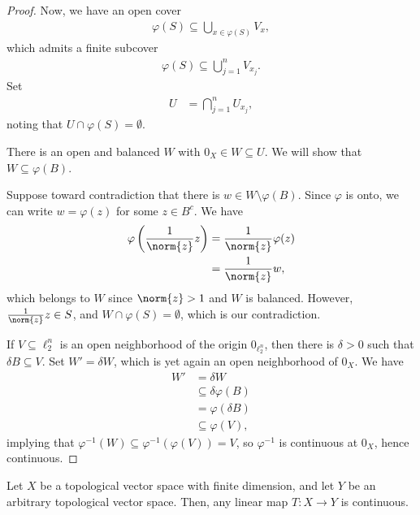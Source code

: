 \documentclass[10pt]{mypackage}
\begin{document}
\begin{proof}
  Now, we have an open cover
  \begin{align*}
    \varphi(S) \subseteq \bigcup_{x\in\varphi(S)}V_{x},
  \end{align*}
  which admits a finite subcover
  \begin{align*}
    \varphi(S) \subseteq \bigcup_{j=1}^{n}V_{x_j}.
  \end{align*}
  Set
  \begin{align*}
    U &= \bigcap_{j=1}^{n}U_{x_j},
  \end{align*}
  noting that $U\cap \varphi(S) = \emptyset$.\newline

  There is an open and balanced $W$ with $0_{X}\in W\subseteq U$. We will show that $W\subseteq \varphi(B)$.\newline

  Suppose toward contradiction that there is $w\in W\setminus \varphi(B)$. Since $\varphi$ is onto, we can write $w = \varphi(z)$ for some $z\in B^{c}$. We have
  \begin{align*}
    \varphi\left(\frac{1}{\norm{z}}z\right) &= \frac{1}{\norm{z}}\varphi(z)\\
                                            &= \frac{1}{\norm{z}} w,
  \end{align*}
  which belongs to $W$ since $\norm{z} > 1$ and $W$ is balanced. However, $\frac{1}{\norm{z}}z\in S$, and $W\cap \varphi(S) = \emptyset$, which is our contradiction.\newline

  If $V\subseteq \ell_{2}^{n}$ is an open neighborhood of the origin $0_{\ell_{2}^{n}}$, then there is $\delta > 0$ such that $\delta B \subseteq V$. Set $W' = \delta W$, which is yet again an open neighborhood of $0_{X}$. We have
  \begin{align*}
    W' &= \delta W\\
       &\subseteq \delta \varphi(B)\\
       &= \varphi\left(\delta B\right)\\
       &\subseteq \varphi(V),
  \end{align*}
  implying that $\varphi^{-1}\left(W\right) \subseteq \varphi^{-1}\left(\varphi(V)\right) = V$, so $\varphi^{-1}$ is continuous at $0_X$, hence continuous.
\end{proof}
\begin{corollary}
  Let $X$ be a topological vector space with finite dimension, and let $Y$ be an arbitrary topological vector space. Then, any linear map $T: X\rightarrow Y$ is continuous.
\end{corollary}
\end{document}
